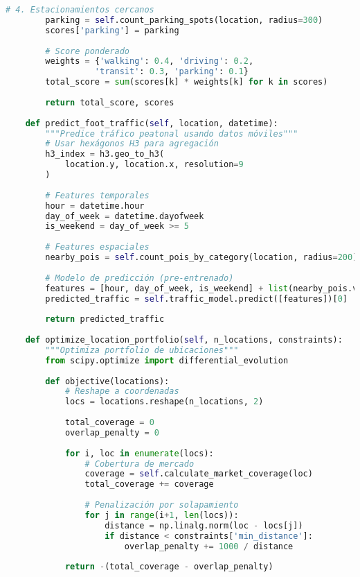 \documentclass[12pt,a4paper]{article}
\begin{document}
\begin{lstlisting}[language=Python, caption=Motor de análisis locacional]
        # 4. Estacionamientos cercanos
        parking = self.count_parking_spots(location, radius=300)
        scores['parking'] = parking
        
        # Score ponderado
        weights = {'walking': 0.4, 'driving': 0.2, 
                  'transit': 0.3, 'parking': 0.1}
        total_score = sum(scores[k] * weights[k] for k in scores)
        
        return total_score, scores
    
    def predict_foot_traffic(self, location, datetime):
        """Predice tráfico peatonal usando datos móviles"""
        # Usar hexágonos H3 para agregación
        h3_index = h3.geo_to_h3(
            location.y, location.x, resolution=9
        )
        
        # Features temporales
        hour = datetime.hour
        day_of_week = datetime.dayofweek
        is_weekend = day_of_week >= 5
        
        # Features espaciales
        nearby_pois = self.count_pois_by_category(location, radius=200)
        
        # Modelo de predicción (pre-entrenado)
        features = [hour, day_of_week, is_weekend] + list(nearby_pois.values())
        predicted_traffic = self.traffic_model.predict([features])[0]
        
        return predicted_traffic
    
    def optimize_location_portfolio(self, n_locations, constraints):
        """Optimiza portfolio de ubicaciones"""
        from scipy.optimize import differential_evolution
        
        def objective(locations):
            # Reshape a coordenadas
            locs = locations.reshape(n_locations, 2)
            
            total_coverage = 0
            overlap_penalty = 0
            
            for i, loc in enumerate(locs):
                # Cobertura de mercado
                coverage = self.calculate_market_coverage(loc)
                total_coverage += coverage
                
                # Penalización por solapamiento
                for j in range(i+1, len(locs)):
                    distance = np.linalg.norm(loc - locs[j])
                    if distance < constraints['min_distance']:
                        overlap_penalty += 1000 / distance
            
            return -(total_coverage - overlap_penalty)
        

\end{lstlisting}
\end{document}
